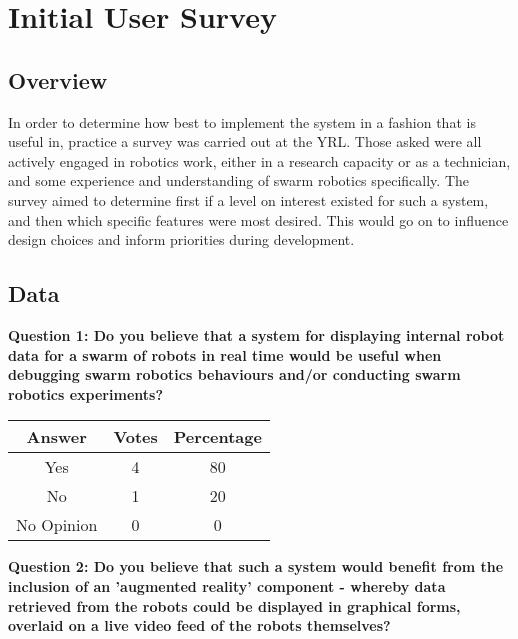 
\chapter[Initial User Survey]{Initial User Survey} %

\label{Chapter7} %


\section{Overview}
In order to determine how best to implement the system in a fashion that is useful in, practice a survey was carried out at the YRL. Those asked were all actively engaged in robotics work, either in a research capacity or as a technician, and some experience and understanding of swarm robotics specifically. The survey aimed to determine first if a level on interest existed for such a system, and then which specific features were most desired. This would go on to influence design choices and inform priorities during development.


\section{Data}
\noindent\textbf{Question 1: Do you believe that a system for displaying internal robot data for a swarm of robots in real time would be useful when debugging swarm robotics behaviours and/or conducting swarm robotics experiments?}

\begin{center}
\begin{tabular}{ c c c }
 Answer & Votes & Percentage \\ 
 \hline
 Yes & 4 & 80 \\ 
 No & 1 & 20 \\
 No Opinion & 0 & 0 \\
\end{tabular}
\end{center}

\vspace{1cm}

\noindent\textbf{Question 2: Do you believe that such a system would benefit from the inclusion of an 'augmented reality' component - whereby data retrieved from the robots could be displayed in graphical forms, overlaid on a live video feed of the robots themselves?}

